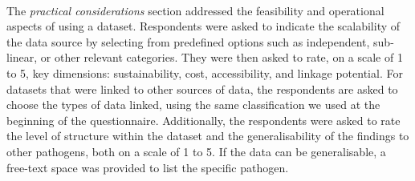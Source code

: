 \documentclass{article}
\begin{document}
\paragraph{}The \textit{practical considerations} section addressed the feasibility and operational aspects of using a dataset. Respondents were asked to indicate the scalability of the data source by selecting from predefined options such as independent, sub-linear, or other relevant categories. They were then asked to rate, on a scale of 1 to 5, key dimensions: sustainability, cost, accessibility, and linkage potential. For datasets that were linked to other sources of data, the respondents are asked to choose the types of data linked, using the same classification we used at the beginning of the questionnaire.  Additionally, the respondents were asked to rate the level of structure within the dataset and the generalisability of the findings to other pathogens, both on a scale of 1 to 5. If the data can be generalisable, a free-text space was provided to list the specific pathogen. 
\end{document}

